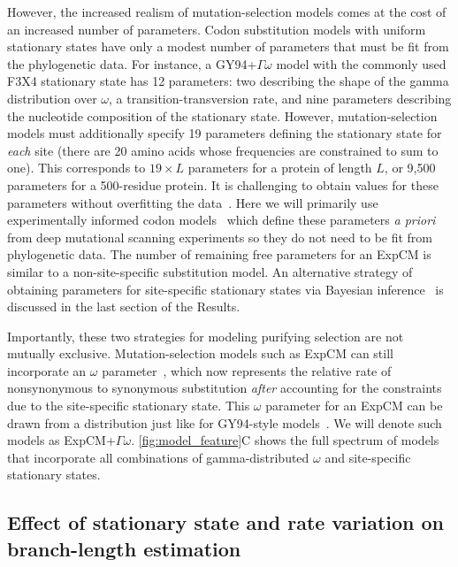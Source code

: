 \documentclass[11pt]{article}
\begin{document}
However, the increased realism of mutation-selection models comes at the cost of an increased number of parameters. 
Codon substitution models with uniform stationary states have only a modest number of parameters that must be fit from the phylogenetic data.
For instance, a GY94+$\Gamma\omega$ model with the commonly used F3X4 stationary state has 12 parameters: two describing the shape of the gamma distribution over $\omega$, a transition-transversion rate, and nine parameters describing the nucleotide composition of the stationary state.
However, mutation-selection models must additionally specify 19 parameters defining the stationary state for \emph{each} site (there are 20 amino acids whose frequencies are constrained to sum to one).
This corresponds to $19\times L$ parameters for a protein of length $L$, or 9,500 parameters for a 500-residue protein.
It is challenging to obtain values for these parameters without overfitting the data~\citep{rodrigue2013statistical}.
Here we will primarily use experimentally informed codon models~\citep[ExpCM's;][]{bloom2014experimentally, hilton2017phydms, bloom2017identification} which define these parameters \textit{a priori} from deep mutational scanning experiments so they do not need to be fit from phylogenetic data.
The number of remaining free parameters for an ExpCM is similar to a non-site-specific substitution model.
An alternative strategy of obtaining parameters for site-specific stationary states via Bayesian inference~\citep{lartillot2004bayesian, rodrigue2014site} is discussed in the last section of the Results.

Importantly, these two strategies for modeling purifying selection are not mutually exclusive.
Mutation-selection models such as ExpCM can still incorporate an $\omega$ parameter~\citep{rodrigue2016detecting, bloom2017identification}, which now represents the relative rate of nonsynonymous to synonymous substitution \emph{after} accounting for the constraints due to the site-specific stationary state.
This $\omega$ parameter for an ExpCM can be drawn from a distribution just like for GY94-style models~\citep{haddox2017mapping, rodrigue2014site}. 
We will denote such models as ExpCM+$\Gamma\omega$.
\ref{fig:model_feature}C shows the full spectrum of models that incorporate all combinations of gamma-distributed $\omega$ and site-specific stationary states.

\subsection*{Effect of stationary state and rate variation on branch-length estimation}
\end{document}
